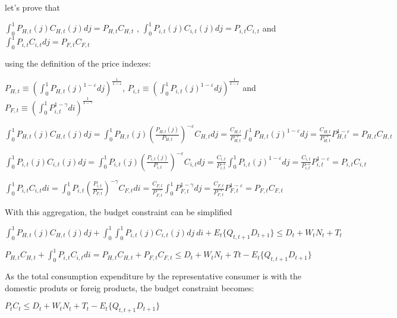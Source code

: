 \documentclass[
]{article}
\begin{document}
let's prove that

\(\displaystyle \int_0^1 P_{H,t}(j)C_{H,t}(j)dj = P_{H,t}C_{H,t}\) ,
\(\displaystyle \int_0^1 P_{i,t}(j)C_{i,t}(j)dj = P_{i,t}C_{i,t}\) and
\(\displaystyle \int_0^1 P_{i,t}C_{i,t}dj = P_{F,t}C_{F,t}\)

using the definition of the price indexes:

\(\displaystyle P_{H,t} \equiv \left( \int_0^1 P_{H,t}(j)^{1-\varepsilon}dj \right)^{\frac{1}{1-\varepsilon}}\),
\(\displaystyle P_{i,t} \equiv \left( \int_0^1 P_{i,t}(j)^{1-\varepsilon}dj \right)^{\frac{1}{1-\varepsilon}}\)
and
\(\displaystyle P_{F,t} \equiv \left( \int_0^1 P_{i,t}^{1-\gamma}di \right)^{\frac{1}{1-\gamma}}\)

\(\displaystyle \int_0^1 P_{H,t}(j)C_{H,t}(j)dj = \int_0^1P_{H,t}(j)\left( \frac{P_{H,t}(j)}{P_{H,t}}\right)^{-\varepsilon}C_{H,t}dj = \frac{C_{H,t}}{P_{H,t}^{-\varepsilon}}\int_0^1P_{H,t}(j)^{1-\varepsilon}dj = \frac{C_{H,t}}{P_{H,t}^{-\varepsilon}}P_{H,t}^{1-\varepsilon} = P_{H,t}C_{H,t}\)

\(\displaystyle \int_0^1 P_{i,t}(j)C_{i,t}(j)dj = \int_0^1P_{i,t}(j)\left( \frac{P_{i,t}(j)}{P_{i,t}}\right)^{-\varepsilon}C_{i,t}dj = \frac{C_{i,t}}{P_{i,t}^{-\varepsilon}}\int_0^1 P_{i,t}(j)^{1-\varepsilon}dj = \frac{C_{i,t}}{P_{i,t}^{-\varepsilon}}P_{i,t}^{1-\varepsilon} = P_{i,t}C_{i,t}\)

\(\displaystyle \int_0^1 P_{i,t}C_{i,t}di = \int_0^1P_{i,t}\left( \frac{P_{i,t}}{P_{F,t}}\right)^{-\gamma}C_{F,t}di = \frac{C_{F,t}}{P_{F,t}^{-\gamma}}\int_0^1 P_{F,t}^{1-\gamma}dj = \frac{C_{F,t}}{P_{F,t}^{-\varepsilon}}P_{F,t}^{1-\varepsilon} = P_{F,t}C_{F,t}\)

With this aggregation, the budget constraint can be simplified

\(\displaystyle \int_0^1 P_{H,t}(j)C_{H,t}(j)dj + \int_0^1\int_0^1 P_{i,t}(j)C_{i,t}(j)dj\ di + E_t\{ Q_{t,t+1}D_{t+1}\} \leq D_t + W_tN_t + T_t\)

\(\displaystyle P_{H,t}C_{H,t} + \int_0^1P_{i,t}C_{i,t}di = P_{H,t}C_{H,t} + P_{F,t}C_{F,t} \leq D_t + W_tN_t + Tt - E_t\{ Q_{t,t+1}D_{t+1}\}\)

As the total consumption expenditure by the representative consumer is
with the domestic produts or foreig products, the budget constraint
becomes:

\(\displaystyle P_t C_t \leq D_t + W_tN_t + T_t - E_t\{ Q_{t,t+1}D_{t+1}\}\)

\vspace{12pt}
\end{document}
